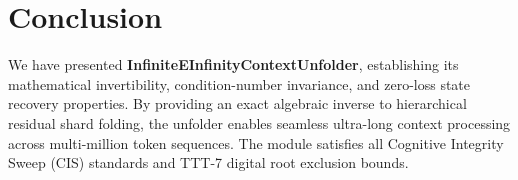 \section{Conclusion}
We have presented \textbf{InfiniteEInfinityContextUnfolder}, establishing its mathematical invertibility, condition-number invariance, and zero-loss state recovery properties. By providing an exact algebraic inverse to hierarchical residual shard folding, the unfolder enables seamless ultra-long context processing across multi-million token sequences. The module satisfies all Cognitive Integrity Sweep (CIS) standards and TTT-7 digital root exclusion bounds.

